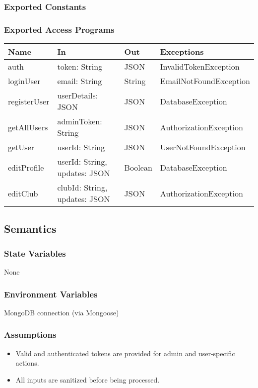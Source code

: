 \documentclass[12pt, titlepage]{article}
\begin{document}
\subsubsection{Exported Constants}

\subsubsection{Exported Access Programs}

\begin{center}
\begin{tabular}{p{2cm} p{4cm} p{2cm} p{4cm}}
\hline
\textbf{Name} & \textbf{In} & \textbf{Out} & \textbf{Exceptions} \\
\hline
auth & token: String & JSON & InvalidTokenException \\
loginUser & email: String & String & EmailNotFoundException \\
registerUser & userDetails: JSON & JSON & DatabaseException \\
getAllUsers & adminToken: String & JSON & AuthorizationException \\
getUser & userId: String & JSON & UserNotFoundException \\
editProfile & userId: String, updates: JSON & Boolean & DatabaseException \\
editClub & clubId: String, updates: JSON & JSON & AuthorizationException \\
\hline
\end{tabular}
\end{center}

\subsection{Semantics}

\subsubsection{State Variables}
None

\subsubsection{Environment Variables}
MongoDB connection (via Mongoose)

\subsubsection{Assumptions}
\begin{itemize}
  \item Valid and authenticated tokens are provided for admin and user-specific actions.
  \item All inputs are sanitized before being processed.
\end{itemize}
\end{document}
